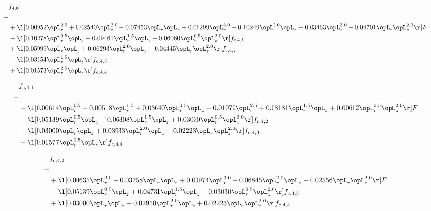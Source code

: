 \begin{alignat}{2} 
\label{eq:f_40_2} 
& f_{4,0} \nonumber \\ 
 = \\ 
& + \l[  0.00952 \opL_r^{2.0} +  0.02540 \opL_z^{2.0}   -0.07453 \opL_r \opL_z +  0.01299 \opL_r^{3.0}   -0.10249 \opL_r^{2.0} \opL_z +  0.03463 \opL_z^{3.0}   -0.04701 \opL_r \opL_z^{2.0}  \r] F \nonumber \\ 
& - \l[  0.10278 \opL_r^{0.5} \opL_z +  0.09461 \opL_r^{1.5} \opL_z +  0.06060 \opL_r^{0.5} \opL_z^{2.0}  \r] f_{c,4,1} \nonumber \\ 
& + \l[  0.05999 \opL_r \opL_z +  0.06293 \opL_r^{2.0} \opL_z +  0.04445 \opL_r \opL_z^{2.0}  \r] f_{c,4,2} \nonumber \\ 
& - \l[  0.03154 \opL_r^{1.5} \opL_z  \r] f_{c,4,3} \nonumber \\ 
& + \l[  0.01573 \opL_r^{2.0} \opL_z  \r] f_{c,4,4} \nonumber \\ 
\end{alignat} 


\begin{alignat}{2} 
\label{eq:f_41_2} 
& f_{c,4,1} \nonumber \\ 
 = \\ 
& + \l[  0.00614 \opL_r^{0.5}   -0.00518 \opL_r^{1.5} +  0.03640 \opL_r^{0.5} \opL_z   -0.01079 \opL_r^{2.5} +  0.08181 \opL_r^{1.5} \opL_z +  0.00612 \opL_r^{0.5} \opL_z^{2.0}  \r] F \nonumber \\ 
& - \l[  0.05139 \opL_r^{0.5} \opL_z +  0.06308 \opL_r^{1.5} \opL_z +  0.03030 \opL_r^{0.5} \opL_z^{2.0}  \r] f_{c,4,2} \nonumber \\ 
& + \l[  0.03000 \opL_r \opL_z +  0.03933 \opL_r^{2.0} \opL_z +  0.02223 \opL_r \opL_z^{2.0}  \r] f_{c,4,3} \nonumber \\ 
& - \l[  0.01577 \opL_r^{1.5} \opL_z  \r] f_{c,4,4} \nonumber \\ 
\end{alignat} 


\begin{alignat}{2} 
\label{eq:f_42_2} 
& f_{c,4,2} \nonumber \\ 
 = \\ 
& + \l[  0.00635 \opL_r^{2.0}   -0.03758 \opL_r \opL_z +  0.00974 \opL_r^{3.0}   -0.06845 \opL_r^{2.0} \opL_z   -0.02556 \opL_r \opL_z^{2.0}  \r] F \nonumber \\ 
& - \l[  0.05139 \opL_r^{0.5} \opL_z +  0.04731 \opL_r^{1.5} \opL_z +  0.03030 \opL_r^{0.5} \opL_z^{2.0}  \r] f_{c,4,3} \nonumber \\ 
& + \l[  0.03000 \opL_r \opL_z +  0.02950 \opL_r^{2.0} \opL_z +  0.02223 \opL_r \opL_z^{2.0}  \r] f_{c,4,4} \nonumber \\ 
\end{alignat} 



